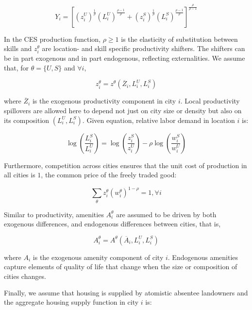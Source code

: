 \begin{equation}
  Y_i = \left[ (z_i^U)^{\frac{1}{\rho}} (L_i^U)^{\frac{\rho - 1}{\rho}} + (z_i^S)^{\frac{1}{\rho}} (L_i^S)^{\frac{\rho - 1}{\rho}} \right]^{\frac{\rho}{\rho - 1}}
\end{equation}

In the CES production function, $\rho \geq 1$ is the elasticity of substitution between skills and $z_i^{\theta}$ are location- and skill specific productivity shifters. The shifters can be in part exogenous and in part endogenous, reflecting externalities. We assume that, for $\theta = \{U, S\}$ and $\forall i$,

\begin{equation}
  z_i^{\theta} = z^{\theta}(\overline{Z}_i, L_i^U, L_i^S) 
\end{equation}

where $\overline{Z}_i$ is the exogenous productivity component in city $i$. Local productivity spillovers are allowed here to depend not just on city size or density but also on its composition $(L_i^U, L_i^S)$. Given equation, relative labor demand in location $i$ is:

\begin{equation}
  \log (\frac{L_i^S}{L_i^U}) = \log (\frac{z_i^S}{z_i^U}) - \rho \log(\frac{w_i^S}{w_i^U}) 
\end{equation}

Furthermore, competition across cities ensures that the unit cost of production in all cities is $1$, the common price of the freely traded good:

\begin{equation*}
  \sum_{\theta} z_i^{\theta} (w_i^{\theta})^{1 - \rho} = 1, \forall i
\end{equation*}

Similar to productivity, amenities $A_i^{\theta}$ are assumed to be driven by both exogenous differences, and endogenous differences between cities, that is,

\begin{equation}
  A_i^{\theta} = A^{\theta}(\overline{A}_i, L_i^U, L_i^S)
\end{equation}

where $A_i$ is the exogenous amenity component of city $i$. Endogenous amenities capture elements of quality of life that change when the size or composition of cities changes.

Finally, we assume that housing is supplied by atomistic absentee landowners and the aggregate housing supply function in city $i$ is:

